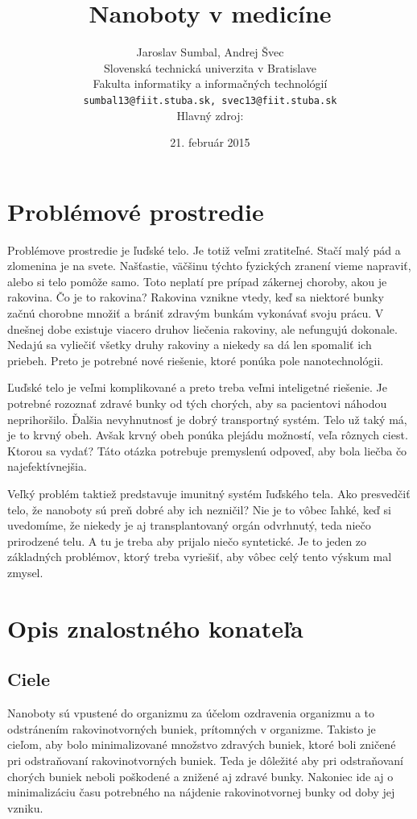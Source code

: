 \documentclass[10pt,twoside,slovak,a4paper]{article}
\title{Nanoboty v medicíne}
\author{Jaroslav Sumbal, Andrej Švec\\[2pt]
	{\small Slovenská technická univerzita v Bratislave}\\
	{\small Fakulta informatiky a informačných technológií}\\
	{\small \texttt{sumbal13@fiit.stuba.sk, svec13@fiit.stuba.sk}}\\
	{\small Hlavný zdroj: \cite{Zdroj}}
	}
\date{\small 21. február 2015} %
\begin{document}
\maketitle


\begin{abstract}


\end{abstract}

\section{Problémové prostredie}

Problémove prostredie je ľuďské telo. Je totiž veľmi zratiteľné. Stačí malý pád a zlomenina je na svete. Našťastie, väčšinu týchto fyzických zranení vieme napraviť, alebo si telo pomôže samo. Toto neplatí pre prípad zákernej choroby, akou je rakovina. Čo je to rakovina? Rakovina vznikne vtedy, keď sa niektoré bunky začnú chorobne množiť a brániť zdravým bunkám vykonávať svoju prácu. V dnešnej dobe existuje viacero druhov liečenia rakoviny, ale nefungujú dokonale. Nedajú sa vyliečiť všetky druhy rakoviny a niekedy sa dá len spomaliť ich priebeh. Preto je potrebné nové riešenie, ktoré ponúka pole nanotechnológii.

Ľuďské telo je veľmi komplikované a preto treba veľmi inteligetné riešenie. Je potrebné rozoznať zdravé bunky od tých chorých, aby sa pacientovi náhodou neprihoršilo. Ďalšia nevyhnutnosť je dobrý transportný systém. Telo už taký má, je to krvný obeh. Avšak krvný obeh ponúka plejádu možností, veľa rôznych ciest. Ktorou sa vydať? Táto otázka potrebuje premyslenú odpoveď, aby bola liečba čo najefektívnejšia.

Veľký problém taktiež predstavuje imunitný systém ľuďského tela. Ako presvedčiť telo, že nanoboty sú preň dobré aby ich nezničil? Nie je to vôbec ľahké, keď si uvedomíme, že niekedy je aj transplantovaný orgán odvrhnutý, teda niečo prirodzené telu. A tu je treba aby prijalo niečo syntetické. Je to jeden zo základných problémov, ktorý treba vyriešiť, aby vôbec celý tento výskum mal zmysel.

\section{Opis znalostného konateľa}

\subsection{Ciele}
Nanoboty sú vpustené do organizmu za účelom ozdravenia organizmu a to odstránením rakovinotvorných buniek, prítomných v organizme. Takisto je cieľom, aby bolo minimalizované množstvo zdravých buniek, ktoré boli zničené pri odstraňovaní rakovinotvorných buniek. Teda je dôležité aby pri odstraňovaní chorých buniek neboli poškodené a znižené aj zdravé bunky. Nakoniec ide aj o minimalizáciu času potrebného na nájdenie rakovinotvornej bunky od doby jej vzniku.
\end{document}
